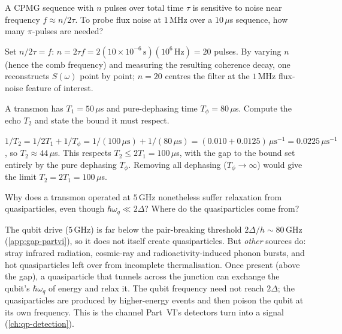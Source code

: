 \begin{exercise}
A CPMG sequence with $n$ pulses over total time $\tau$ is sensitive to
noise near frequency $f\approx n/2\tau$. To probe flux noise at
$1\,$MHz over a $10\,\mu$s sequence, how many $\pi$-pulses are needed?
\begin{solution}
Set $n/2\tau=f$: $n=2\tau f=2(10\times10^{-6}\,\text{s})(10^6\,\text{Hz})
=20$ pulses. By varying $n$ (hence the comb frequency) and measuring the
resulting coherence decay, one reconstructs $S(\omega)$ point by point;
$n=20$ centres the filter at the $1\,$MHz flux-noise feature of
interest.
\end{solution}
\end{exercise}

\begin{exercise}
A transmon has $T_1=50\,\mu$s and pure-dephasing time
$T_\phi=80\,\mu$s. Compute the echo $T_2$ and state the bound it must
respect.
\begin{solution}
$1/T_2=1/2T_1+1/T_\phi=1/(100\,\mu\text{s})+1/(80\,\mu\text{s})
=(0.010+0.0125)\,\mu\text{s}^{-1}=0.0225\,\mu\text{s}^{-1}$, so
$T_2\approx44\,\mu$s. This respects $T_2\le2T_1=100\,\mu$s, with the gap
to the bound set entirely by the pure dephasing $T_\phi$. Removing all
dephasing ($T_\phi\to\infty$) would give the limit $T_2=2T_1=100\,\mu$s.
\end{solution}
\end{exercise}

\begin{exercise}
Why does a transmon operated at $5\,$GHz nonetheless suffer relaxation
from quasiparticles, even though $\hbar\omega_q\ll2\Delta$? Where do the
quasiparticles come from?
\begin{solution}
The qubit drive ($5\,$GHz) is far below the pair-breaking threshold
$2\Delta/h\sim80\,$GHz (\cref{app:gap-partvi}), so it does not itself
create quasiparticles. But \emph{other} sources do: stray infrared
radiation, cosmic-ray and radioactivity-induced phonon bursts, and
hot quasiparticles left over from incomplete thermalisation. Once
present (above the gap), a quasiparticle that tunnels across the
junction can exchange the qubit's $\hbar\omega_q$ of energy and relax
it. The qubit frequency need not reach $2\Delta$; the quasiparticles
are produced by higher-energy events and then poison the qubit at its
own frequency. This is the channel Part~VI's detectors turn into a
signal (\cref{ch:qp-detection}).
\end{solution}
\end{exercise}

